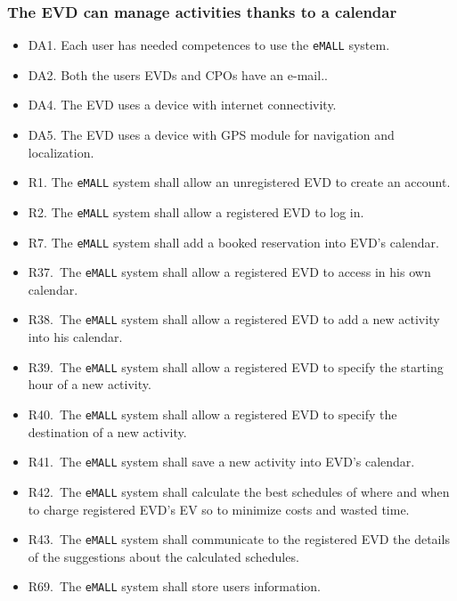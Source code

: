 \subsubsection{The EVD can manage activities thanks to a calendar}
\begin{itemize}
    \item DA1. Each user has needed competences to use the \verb|eMALL| system.
    \item DA2. Both the users EVDs and CPOs have an e-mail..
    \item DA4. The EVD uses a device with internet connectivity.
    \item DA5. The EVD uses a device with GPS module for navigation and localization.
    \item R1. The \verb|eMALL| system shall allow an unregistered EVD to create an account.
    \item R2. The \verb|eMALL| system shall allow a registered EVD to log in.
    \item R7. The \verb|eMALL| system shall add a booked reservation into EVD’s calendar.
    \item R37.\ The \verb|eMALL| system shall allow a registered EVD to access in his own calendar.
    \item R38.\ The \verb|eMALL| system shall allow a registered EVD to add a new activity into his
    calendar.
    \item R39.\ The \verb|eMALL| system shall allow a registered EVD to specify the starting hour of a
    new activity.
    \item R40.\ The \verb|eMALL| system shall allow a registered EVD to specify the destination of a
    new activity.
    \item R41.\ The \verb|eMALL| system shall save a new activity into EVD’s calendar.
    \item R42.\ The \verb|eMALL| system shall calculate the best schedules of where and when to charge
    registered EVD’s EV so to minimize costs and wasted time.
    \item R43.\ The \verb|eMALL| system shall communicate to the registered EVD the details of the
    suggestions about the calculated schedules.
    \item R69.\ The \verb|eMALL| system shall store users information.
\end{itemize}

